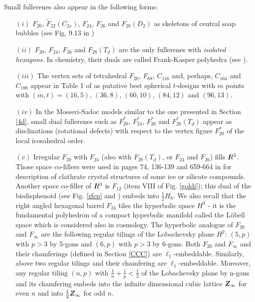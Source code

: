 \noindent
Small fullerenes also appear in the following forms:
\begin{itemize}
\item[$(i)$] $F_{20}$, $\tilde{F}_{22}(C_{2v})$, $F_{24}$, $F_{26}$ and $F_{28}(D_2)$
as skeletons of central soap bubbles (see Fig. 9.13 in \cite{f86})
\item[$(ii)$] $F_{20}$, $F_{24}$, $F_{26}$ and $F_{28}(T_d)$ are the only fullerenes
with {\it isolated hexagons}. In chemistry, their duals are called {\sc Frank-Kasper}
polyhedra (see \cite{fk58}).
\item[$(iii)$] The vertex sets of tetrahedral $F_{28}$, $F_{68}$, $C_{116}$ and, perhaps, 
$C_{164}$ and  $C_{188}$ appear in Table 1 of \cite{sloan} as putative best spherical 
$t$-designs with $m$ points with $(m,t)=(16,5)$, $(36,8)$, $(60,10)$, $(84,12)$ and $(96,13)$.
\item[$(iv)$] In the {\sc Mosseri-Sadoc} \cite{ms90b,msbook} models similar to the one presented in
Section \ref{4d},
small dual fullerenes such as $F^*_{20}$, $F^*_{24}$, $F^*_{26}$ and $F^*_{28}(T_d)$
appear as disclinations
(rotational defects) with respect to the vertex figure $F^*_{20}$ of the local
icosahedral order.
\item[$(v)$] Irregular $F_{20}$ with $F_{24}$ (also with $F_{28}(T_d)$, or $F_{24}$
and $F_{26}$) fills $I\hspace{-1.7mm}R^{3}$.
Those space co-fillers %
were used in pages 74, 136-139 and 659-664 in \cite{w84}
for description of clathrate crystal structures of some ice or silicate 
compounds.
Another space co-filler of $I\hspace{-1.7mm}R^{3}$ is $F_{12}$ (item VIII of Fig. \ref{goldi});
this dual of the bisdisphenoid (see Fig. \ref{rfcp} and \cite{b71,Za})
embeds into $\frac{1}{2}H_8$. We also recall that the right angled hexagonal barrel
$F_{24}$ tiles the hyperbolic space $H^3$ - it is the fundamental polyhedron of a compact 
hyperbolic manifold called the {\sc L\"obell} space which is considered also in cosmology.
The hyperbolic analogue of $F_{20}$ and $F_{\infty}$ are the following regular tilings of
the {\sc Lobachevsky} plane $H^2$: $(5,p)$  with $p>3$ by 5-gons and $(6,p)$ with $p>3$ 
by 6-gons.
Both $F_{20}$ and $F_{\infty}$ and their chamferings (defined in Section \ref{CCC})
are $\ell_1$-embeddable.
Similarly, above two regular tilings and their chamfering are $\ell_1$-embeddable.
Moreover, any regular tiling $(n,p)$ with $\frac{1}{n}+\frac{1}{p}<\frac{1}{2}$ of the {\sc Lobachevsky} 
plane by n-gons and its chamfering embeds into the infinite dimensional cubic lattice 
$Z\hspace{-2.5mm}Z_{\infty}$ for even $n$ and into $\frac{1}{2}Z\hspace{-2.5mm}Z_{\infty}$ 
for odd $n$.
\end{itemize}


